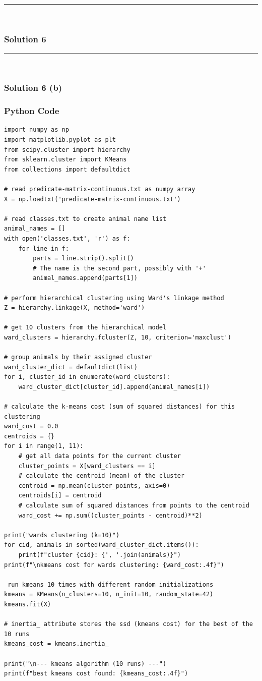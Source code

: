 \documentclass{article}
\begin{document}
\noindent\rule{\textwidth}{0.4pt}\\

\newpage

\subsubsection*{Solution 6}
\noindent\rule{\textwidth}{0.4pt}\\
\subsubsection*{Solution 6 (b)}
\subsubsection*{Python Code}
\begin{lstlisting}
import numpy as np
import matplotlib.pyplot as plt
from scipy.cluster import hierarchy
from sklearn.cluster import KMeans
from collections import defaultdict

# read predicate-matrix-continuous.txt as numpy array
X = np.loadtxt('predicate-matrix-continuous.txt')

# read classes.txt to create animal name list
animal_names = []
with open('classes.txt', 'r') as f:
    for line in f:
        parts = line.strip().split()
        # The name is the second part, possibly with '+'
        animal_names.append(parts[1])

# perform hierarchical clustering using Ward's linkage method
Z = hierarchy.linkage(X, method='ward')

# get 10 clusters from the hierarchical model
ward_clusters = hierarchy.fcluster(Z, 10, criterion='maxclust')

# group animals by their assigned cluster
ward_cluster_dict = defaultdict(list)
for i, cluster_id in enumerate(ward_clusters):
    ward_cluster_dict[cluster_id].append(animal_names[i])

# calculate the k-means cost (sum of squared distances) for this clustering
ward_cost = 0.0
centroids = {}
for i in range(1, 11):
    # get all data points for the current cluster
    cluster_points = X[ward_clusters == i]
    # calculate the centroid (mean) of the cluster
    centroid = np.mean(cluster_points, axis=0)
    centroids[i] = centroid
    # calculate sum of squared distances from points to the centroid
    ward_cost += np.sum((cluster_points - centroid)**2)

print("wards clustering (k=10)")
for cid, animals in sorted(ward_cluster_dict.items()):
    print(f"cluster {cid}: {', '.join(animals)}")
print(f"\nkmeans cost for wards clustering: {ward_cost:.4f}")

 run kmeans 10 times with different random initializations
kmeans = KMeans(n_clusters=10, n_init=10, random_state=42)
kmeans.fit(X)

# inertia_ attribute stores the ssd (kmeans cost) for the best of the 10 runs
kmeans_cost = kmeans.inertia_

print("\n--- kmeans algorithm (10 runs) ---")
print(f"best kmeans cost found: {kmeans_cost:.4f}")
\end{lstlisting}
\end{document}

